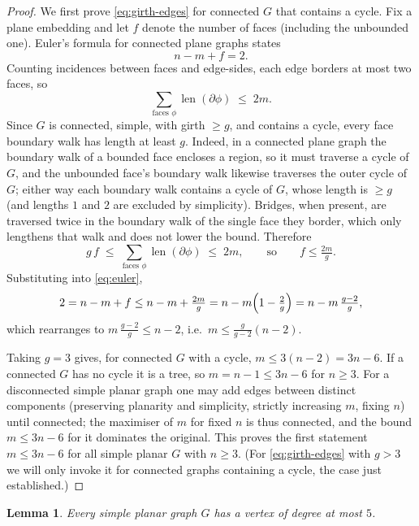 \documentclass{amsart}
\newtheorem{lemma}{Lemma}
\theoremstyle{remark}
\begin{document}
\begin{proof}
We first prove \eqref{eq:girth-edges} for connected $G$ that contains a cycle.
Fix a plane embedding and let $f$ denote the number of faces (including the
unbounded one). Euler's formula for connected plane graphs states
\begin{equation}\label{eq:euler}
   n - m + f = 2 .
\end{equation}
Counting incidences between faces and edge-sides, each edge borders at most two
faces, so
\[
   \sum_{\text{faces } \phi}\operatorname{len}(\partial\phi)\;\le\;2m .
\]
Since $G$ is connected, simple, with girth $\ge g$, and contains a cycle, every
face boundary walk has length at least $g$. Indeed, in a connected plane graph
the boundary walk of a bounded face encloses a region, so it must traverse a
cycle of $G$, and the unbounded face's boundary walk likewise traverses the outer
cycle of $G$; either way each boundary walk contains a cycle of $G$, whose length
is $\ge g$ (and lengths $1$ and $2$ are excluded by simplicity). Bridges, when
present, are traversed twice in the boundary walk of the single face they border,
which only lengthens that walk and does not lower the bound. Therefore
\[
   g\,f \;\le\; \sum_{\text{faces }\phi}\operatorname{len}(\partial\phi)\;\le\;2m,
   \qquad\text{so}\qquad f\le \tfrac{2m}{g}.
\]
Substituting into \eqref{eq:euler},
\[
   2 = n-m+f \le n - m + \tfrac{2m}{g} = n - m\Bigl(1-\tfrac{2}{g}\Bigr)
       = n - m\,\tfrac{g-2}{g},
\]
which rearranges to $m\,\tfrac{g-2}{g}\le n-2$, i.e.\
$m\le \tfrac{g}{g-2}(n-2)$.

Taking $g=3$ gives, for connected $G$ with a cycle, $m\le 3(n-2)=3n-6$. If a
connected $G$ has no cycle it is a tree, so $m=n-1\le 3n-6$ for $n\ge3$. For a
disconnected simple planar graph one may add edges between distinct components
(preserving planarity and simplicity, strictly increasing $m$, fixing $n$) until
connected; the maximiser of $m$ for fixed $n$ is thus connected, and the bound
$m\le 3n-6$ for it dominates the original. This proves the first statement
$m\le3n-6$ for all simple planar $G$ with $n\ge3$. (For \eqref{eq:girth-edges}
with $g>3$ we will only invoke it for connected graphs containing a cycle, the
case just established.)
\end{proof}

\begin{lemma}\label{lem:mindeg}
Every simple planar graph $G$ has a vertex of degree at most $5$.
\end{lemma}
\end{document}
